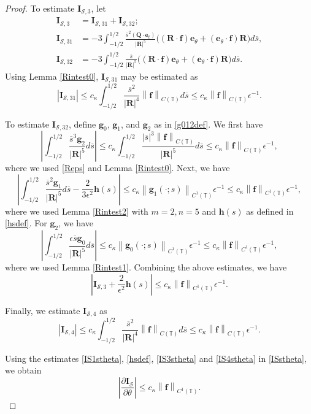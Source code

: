 \documentclass[11pt]{article}
\numberwithin{equation}{section}
\newcommand{\T}{\mathbb{T}}
\newcommand{\bars}{\overline s}
\newcommand{\be}{\bm{e}}
\newcommand{\p}{\partial}
\newcommand{\abs}[1]{\left\lvert #1 \right\rvert}
\newcommand{\norm}[1]{\left\lVert #1 \right\rVert}
\newcommand{\mc}[1]{\mathcal{#1}}
\theoremstyle{definition}
\begin{document}
\begin{proof}
To estimate $\bm{I}_{\mc{S},3}$, let
\begin{align*}
\bm{I}_{\mc{S},3}&=\bm{I}_{\mc{S},31}+\bm{I}_{\mc{S},32}; \\
\bm{I}_{\mc{S},31} &= -3\int_{-1/2}^{1/2}\frac{\bars^2(\bm{Q}\cdot\be_t)}{\abs{\bm{R}}^5} \big((\bm{R}\cdot\bm{f})\be_\theta+(\be_\theta\cdot\bm{f})\bm{R} \big) d\bars,\\
\bm{I}_{\mc{S},32}&= -3\int_{-1/2}^{1/2}\frac{\bars}{\abs{\bm{R}}^5} \big((\bm{R}\cdot\bm{f})\be_\theta+(\be_\theta\cdot\bm{f})\bm{R} \big) d\bars.
\end{align*}
Using Lemma \ref{Rintest0}, $\bm{I}_{\mc{S},31}$ may be estimated as
\[ \abs{\bm{I}_{\mc{S},31}}\le c_\kappa\int_{-1/2}^{1/2}\frac{\bars^2}{\abs{\bm{R}}^4}\norm{\bm{f}}_{C(\T)}d\bars \le c_\kappa\norm{\bm{f}}_{C(\T)}\epsilon^{-1}. \]

To estimate $\bm{I}_{\mc{S},32}$, define $\bm{g}_0$, $\bm{g}_1$, and $\bm{g}_2$ as in \eqref{g012def}. We first have
\[\abs{\int_{-1/2}^{1/2} \frac{\bars^3 \bm{g}_2}{\abs{\bm{R}}^5}d\bars} \le c_\kappa\int_{-1/2}^{1/2} \frac{|\bars|^3\norm{\bm{f}}_{C(\T)}}{\abs{\bm{R}}^5}d\bars \le c_\kappa\norm{\bm{f}}_{C(\T)}\epsilon^{-1}, \]
where we used \eqref{Reps} and Lemma \ref{Rintest0}. Next, we have
\[ \abs{\int_{-1/2}^{1/2} \frac{\bars^2 \bm{g}_1}{\abs{\bm{R}}^5}d\bars - \frac{2}{3\epsilon^2}\bm{h}(s)} \le c_\kappa\norm{\bm{g}_1(\cdot;s)}_{C^1(\T)}\epsilon^{-1} \le c_\kappa\norm{\bm{f}}_{C^1(\T)}\epsilon^{-1}, \]
where we used Lemma \ref{Rintest2} with $m=2, n=5$ and $\bm{h}(s)$ as defined in \eqref{hsdef}. For $\bm{g}_2$, we have
\[\abs{\int_{-1/2}^{1/2} \frac{\epsilon \bars \bm{g}_0}{\abs{\bm{R}}^5}d\bars} \le c_\kappa\norm{\bm{g}_0(\cdot;s)}_{C^1(\T)}\epsilon^{-1}\le c_\kappa\norm{\bm{f}}_{C^1(\T)}\epsilon^{-1}, \]
where we used Lemma \ref{Rintest1}. Combining the above estimates, we have
\begin{equation}\label{IS3stheta}
\abs{\bm{I}_{\mc{S},3}+\frac{2}{\epsilon^2}\bm{h}(s)}\le c_\kappa\norm{\bm{f}}_{C^1(\T)}\epsilon^{-1}.
\end{equation}

Finally, we estimate $\bm{I}_{\mc{S},4}$ as 
\begin{equation}\label{IS4stheta}
\abs{\bm{I}_{\mc{S},4}}\le c_\kappa\int_{-1/2}^{1/2}\frac{\bars^2}{\abs{\bm{R}}^4}\norm{\bm{f}}_{C(\T)}d\bars \le c_\kappa\norm{\bm{f}}_{C(\T)}\epsilon^{-1}.
\end{equation}

Using the estimates \eqref{IS1stheta}, \eqref{hsdef}, \eqref{IS3stheta} and \eqref{IS4stheta} in \eqref{ISstheta}, 
we obtain 
\begin{equation}\label{ISthetaest}
\abs{\frac{\p \bm{I}_{\mc{S}}}{\p \theta}}\le c_\kappa\norm{\bm{f}}_{C^1(\T)}.
\end{equation}


\end{proof}
\end{document}
